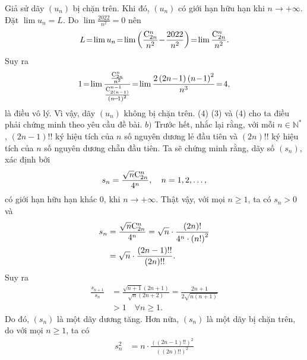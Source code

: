 \begin{multicols}{2}
	\vskip 0.05cm
	Giả sử dãy $(u_n)$  bị chặn trên. Khi đó, $(u_n)$  có giới hạn hữu hạn khi  $n \to + \infty$.
	\vskip 0.05cm
	Đặt $\lim {u_n} = L.$
	Do $\lim \frac{{2022}}{{{n^2}}} = 0$  nên
	\begin{align*}
		L \!=\! \lim {u_n} \!=\! \lim \left( {\frac{{{\rm{C}}_{2n}^n}}{{{n^2}}} \!-\! \frac{{2022}}{{{n^2}}}} \right) \!=\! \lim \frac{{{\rm{C}}_{2n}^n}}{{{n^2}}}.
	\end{align*}
	Suy ra
	\begin{align*}
		1 \!=\! \lim \frac{{\frac{{{\rm{C}}_{2n}^n}}{{{n^2}}}}}{{\frac{{{\rm{C}}_{2\left( {n - 1} \right)}^{n - 1}}}{{{{\left( {n \!-\! 1} \right)}^2}}}}} \!=\! \lim \frac{{2\left( {2n \!-\! 1} \right){{\left( {n \!-\! 1} \right)}^2}}}{{{n^3}}} \!=\! 4,
	\end{align*}
	là điều vô lý. Vì vậy, dãy  $(u_n)$ không bị chặn trên.                            \hfill ($4$)
	\vskip 0.05cm
	($3$) và ($4$) cho ta điều phải chứng minh theo yêu cầu đề bài.
	\vskip 0.05cm
	$b)$\! Trước hết, nhắc lại rằng, với mỗi $n \!\!\in\!\! \mathbb{N^*}$\!, $(2n-1)!!$    ký hiệu tích của $n$ số nguyên dương lẻ đầu tiên và $(2n)!!$  ký hiệu tích của $n$ số nguyên dương chẵn đầu tiên.
	\vskip 0.05cm
	Ta sẽ chứng minh rằng, dãy số $(s_n)$,  xác định bởi
	\begin{align*}
		{s_n} = \frac{{\sqrt n {\rm{C}}_{2n}^n}}{{{4^n}}},\quad n = 1,2,\ldots,
	\end{align*}
	có giới hạn hữu hạn khác $0$, khi $ n \to + \infty$.
	\vskip 0.05cm 
	Thật vậy, với mọi $n \ge  1$, ta có $s_n > 0$  và
	\begin{align*}
		{s_n} &= \frac{{\sqrt n {\rm{C}}_{2n}^n}}{{{4^n}}} = \sqrt n  \cdot \frac{{\left( {2n} \right)!}}{{{4^n} \cdot {{\left( {n!} \right)}^2}}} \\
		&= \sqrt n  \cdot \frac{{\left( {2n - 1} \right)!!}}{{\left( {2n} \right)!!}}.
	\end{align*}
	Suy ra
	\begin{align*}
		\frac{{{s_{n + 1}}}}{{{s_n}}} &= \frac{{\sqrt {n + 1} \left( {2n + 1} \right)}}{{\sqrt n \left( {2n + 2} \right)}} = \frac{{2n + 1}}{{2\sqrt {n\left( {n + 1} \right)} }} \\
		&> 1\quad\forall n \ge 1.
	\end{align*}
	Do đó, $(s_n)$  là một dãy dương tăng.
	\vskip 0.05cm
	Hơn nữa, $(s_n)$  là một dãy bị chặn trên, do với mọi $n \ge  1$, ta có
	\begin{align*}
		s_n^2 &= n \cdot \frac{{{{\left( {\left( {2n - 1} \right)!!} \right)}^2}}}{{{{\left( {\left( {2n} \right)!!} \right)}^2}}} \\[0.5ex]

\end{align*}
\end{multicols}
